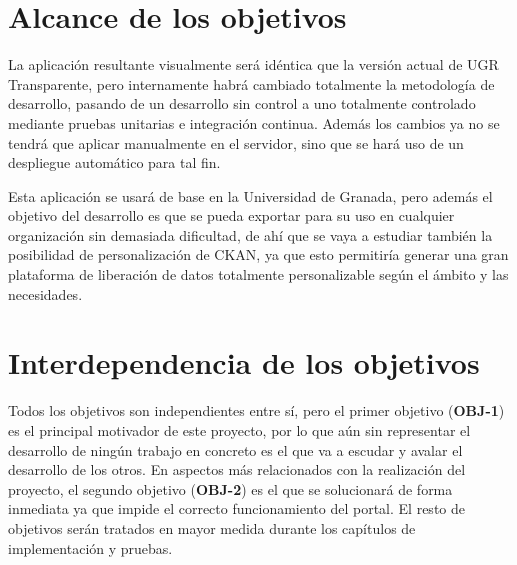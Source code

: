\section{Alcance de los objetivos}

La aplicación resultante visualmente será idéntica que la versión actual de UGR Transparente, pero internamente habrá cambiado totalmente la metodología de desarrollo, pasando de un desarrollo sin control a uno totalmente controlado mediante pruebas unitarias e integración continua. Además los cambios ya no se tendrá que aplicar manualmente en el servidor, sino que se hará uso de un despliegue automático para tal fin.

\bigskip
Esta aplicación se usará de base en la Universidad de Granada, pero además el objetivo del desarrollo es que se pueda exportar para su uso en cualquier organización sin demasiada dificultad, de ahí que se vaya a estudiar también la posibilidad de personalización de CKAN, ya que esto permitiría generar una gran plataforma de liberación de datos totalmente personalizable según el ámbito y las necesidades.

\section{Interdependencia de los objetivos}

Todos los objetivos son independientes entre sí, pero el primer objetivo (\textbf{OBJ-1}) es el principal motivador de este proyecto, por lo que aún sin representar el desarrollo de ningún trabajo en concreto es el que va a escudar y avalar el desarrollo de los otros. En aspectos más relacionados con la realización del proyecto, el segundo objetivo (\textbf{OBJ-2}) es el que se solucionará de forma inmediata ya que impide el correcto funcionamiento del portal. El resto de objetivos serán tratados en mayor medida durante los capítulos de implementación y pruebas.